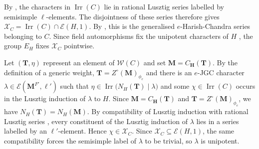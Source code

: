\documentclass[10pt]{amsart}
\theoremstyle{definition}
\let\oldendproof\endproof
\renewenvironment{proof}[1][\proofname]{%
  \oldproof[\bfseries #1]%
}{\oldendproof}
\DeclareMathOperator{\Irr}{Irr}
\numberwithin{equation}{section}
\numberwithin{table}{section}
\begin{document}
\begin{proof}
By \cite[Theorem~4.4(iii)]{CabanesEnguehard1994}, the characters in
$\Irr(C)$ lie in rational Lusztig series labelled by semisimple
$\ell$-elements.  The disjointness of these series therefore gives
$\mathcal X_C=\Irr(C)\cap\mathcal E(H,1)$.
By \cite[Theorem~4.4(i)]{CabanesEnguehard1994}, this is the generalised
$e$-Harish-Chandra series belonging to $C$.
Since field automorphisms fix the unipotent characters of $H$
\cite[p.~700]{CabanesSpath2013}, the group $E_H$
fixes $\mathcal X_C$ pointwise.

Let $(\mathbf T,\eta)$ represent an element of $\mathcal W(C)$
and set $\mathbf M=C_{\mathbf H}(\mathbf T)$.
By the definition of a generic weight,
$\mathbf T=Z^\circ(\mathbf M)_{\phi_e}$ and there is an
$e$-JGC character $\lambda\in\mathcal E(\mathbf M^{F'},\ell')$
such that $\eta\in\Irr\bigl(N_H(\mathbf T)\mid\lambda\bigr)$
and some $\chi\in\Irr(C)$ occurs in the Lusztig induction of
$\lambda$ to $H$.
Since $\mathbf M=C_{\mathbf H}(\mathbf T)$ and
$\mathbf T=Z^\circ(\mathbf M)_{\phi_e}$, we have
$N_H(\mathbf T)=N_H(\mathbf M)$.
By compatibility of Lusztig induction with rational Lusztig series
\cite[Proposition~15.7]{CabanesEnguehard2004}, every constituent of the
Lusztig induction of $\lambda$ lies in a series labelled by an
$\ell'$-element. Hence $\chi\in\mathcal X_C$.
Since $\mathcal X_C\subseteq\mathcal E(H,1)$, the same compatibility
forces the semisimple label of $\lambda$ to be trivial, so $\lambda$
is unipotent.


\end{proof}
\end{document}
